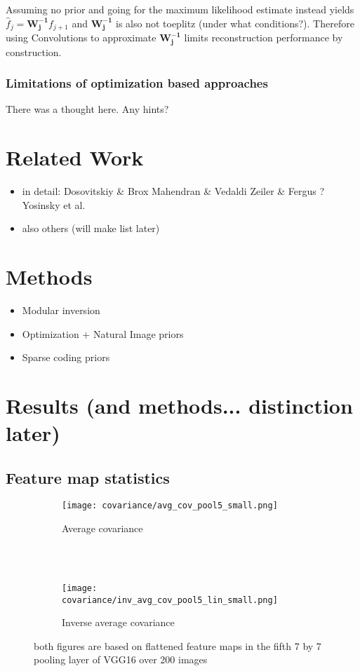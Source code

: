 \documentclass{article}
\begin{document}
Assuming no prior and going for the maximum likelihood estimate instead yields $\hat{f}_j = \bm{W_j^{-1}} f_{j+1}$ and $\bm{W_j^{-1}}$ is also not toeplitz (under what conditions?). Therefore using Convolutions to approximate $\bm{W_j^{-1}}$ limits reconstruction performance by construction.


\subsubsection{Limitations of optimization based approaches}

There was a thought here. Any hints?

\section{Related Work}

\begin{itemize}
	\item in detail:
		\subitem Dosovitskiy \& Brox
		\subitem Mahendran \& Vedaldi
		\subitem Zeiler \& Fergus ?
		\subitem Yosinsky et al.
	\item also others (will make list later)
\end{itemize}


\section{Methods}

\begin{itemize}
	\item Modular inversion
	\item Optimization + Natural Image priors
	\item Sparse coding priors
\end{itemize}


\section{Results (and methods... distinction later)}

\subsection{Feature map statistics}


\begin{figure}
	\centering
	\begin{subfigure}[b]{0.3\textwidth}
		\texttt{[image: covariance/avg\_cov\_pool5\_small.png]}
		\caption{Average covariance \\~}
		\label{fig:cov}
	\end{subfigure}
	~
	\begin{subfigure}[b]{0.3\textwidth}
		\texttt{[image: covariance/inv\_avg\_cov\_pool5\_lin\_small.png]}
		\caption{Inverse average covariance}
		\label{fig:inv_cov}
	\end{subfigure}
	\caption{both figures are based on flattened feature maps in the fifth 7 by 7 pooling layer of VGG16 over 200 images}
	\label{fig:cov_plots}
\end{figure}
\end{document}
